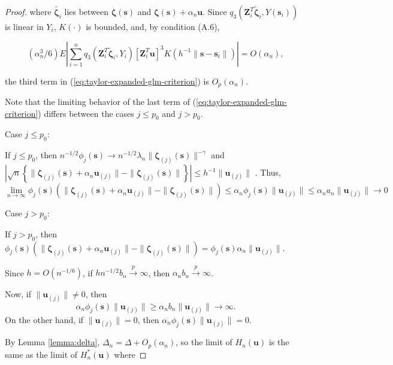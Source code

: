 \documentclass[authoryear,review, 12pt]{elsarticle}
\begin{document}
\begin{proof}
where $\tilde{\bm{\zeta}_{i}}$ lies between $\bm{\zeta}(\bm{s})$
and $\bm{\zeta}(\bm{s})+\alpha_{n}\bm{u}$. Since $q_{3}\left(\bm{Z}_{i}^{T}\tilde{\bm{\zeta}}_{i},Y\left(\bm{s}_{i}\right)\right)$
is linear in $Y_{i}$, $K\left(\cdot\right)$ is bounded, and, by
condition (A.6),

\[
\left(\alpha_{n}^{3}/6\right)E\left|\sum_{i=1}^{n}q_{3}\left(\bm{Z}_{i}^{T}\tilde{\bm{\zeta}}_{i},Y_{i}\right)\left[\bm{Z}_{i}^{T}\bm{u}\right]^{3}K\left(h^{-1}\|\bm{s}-\bm{s}_{i}\|\right)\right|=O\left(\alpha_{n}\right),
\]


the third term in (\ref{eq:taylor-expanded-glm-criterion}) is $O_{p}\left(\alpha_{n}\right)$.

Note that the limiting behavior of the last term of (\ref{eq:taylor-expanded-glm-criterion})
differs between the cases $j\le p_{0}$ and $j>p_{0}$.

Case $j\le p_{0}$:

If $j\le p_{0}$, then $n^{-1/2}\phi_{j}(\bm{s})\to n^{-1/2}\lambda_{n}\|\bm{\zeta}_{\left(j\right)}(\bm{s})\|^{-\gamma}$
and $|\sqrt{n}\left\{ \|\bm{\zeta}_{\left(j\right)}(\bm{s})+\alpha_{n}\bm{u}_{\left(j\right)}\|-\|\bm{\zeta}_{\left(j\right)}(\bm{s})\|\right\} |\le h^{-1}\|\bm{u}_{\left(j\right)}\|$
. Thus, 
\[
\lim\limits _{n\to\infty}\phi_{j}(\bm{s})\left(\|\bm{\zeta}_{\left(j\right)}(\bm{s})+\alpha_{n}\bm{u}_{\left(j\right)}\|-\|\bm{\zeta}_{\left(j\right)}(\bm{s})\|\right)\le\alpha_{n}\phi_{j}(\bm{s})\|\bm{u}_{\left(j\right)}\|\le\alpha_{n}a_{n}\|\bm{u}_{\left(j\right)}\|\to0
\]


Case $j>p_{0}$:

If $j>p_{0}$, then $\phi_{j}(\bm{s})\left(\|\bm{\zeta}_{\left(j\right)}(\bm{s})+\alpha_{n}\bm{u}_{\left(j\right)}\|-\|\bm{\zeta}_{\left(j\right)}(\bm{s})\|\right)=\phi_{j}(\bm{s})\alpha_{n}\|\bm{u}_{\left(j\right)}\|$.

Since $h=O(n^{-1/6})$, if $hn^{-1/2}b_{n}\xrightarrow{p}\infty$,
then $\alpha_{n}b_{n}\xrightarrow{p}\infty$.

Now, if $\|\bm{u}_{\left(j\right)}\|\ne0$, then 
\[
\alpha_{n}\phi_{j}(\bm{s})\|\bm{u}_{\left(j\right)}\|\ge\alpha_{n}b_{n}\|\bm{u}_{\left(j\right)}\|\to\infty.
\]
On the other hand, if $\|\bm{u}_{\left(j\right)}\|=0$, then $\alpha_{n}\phi_{j}(\bm{s})\|\bm{u}_{\left(j\right)}\|=0$.

By Lemma \ref{lemma:delta}, $\Delta_{n}=\Delta+O_{p}\left(\alpha_{n}\right)$,
so the limit of $H_{n}\left(\bm{u}\right)$ is the same as the limit
of $H_{n}^{*}\left(\bm{u}\right)$ where


\end{proof}
\end{document}
